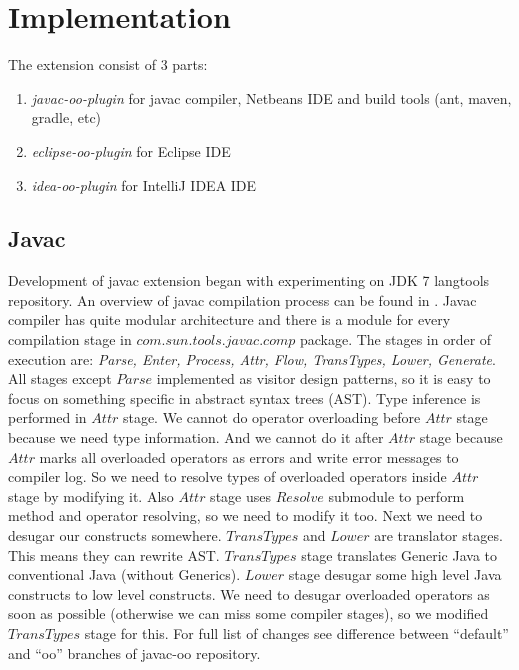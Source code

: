 \documentclass{aircc}
\begin{document}
\section{Implementation}

The extension consist of 3 parts:
\begin{enumerate}
\item \textit{javac-oo-plugin} for javac compiler, Netbeans IDE and build tools (ant, maven, gradle, etc)
\item \textit{eclipse-oo-plugin} for Eclipse IDE
\item \textit{idea-oo-plugin} for IntelliJ IDEA IDE
\end{enumerate}

\subsection{Javac\label{javac}}
Development of javac extension began with experimenting on JDK 7 langtools repository\cite{javac-oo}.
An overview of javac compilation process can be found in \cite{HackerGuideJavac}.
Javac compiler has quite modular architecture and there is a module for every compilation stage in $com.sun.tools.javac.comp$ package.
The stages in order of execution are: \textit{Parse, Enter, Process, Attr, Flow, TransTypes, Lower, Generate}.
All stages except $Parse$ implemented as visitor design patterns, so it is easy to focus on something specific in abstract syntax trees (AST).
Type inference is performed in $Attr$ stage.
We cannot do operator overloading before $Attr$ stage because we need type information. 
And we cannot do it after $Attr$ stage because $Attr$ marks all overloaded operators as errors and write error messages to compiler log.
So we need to resolve types of overloaded operators inside $Attr$ stage by modifying it. 
Also $Attr$ stage uses $Resolve$ submodule to perform method and operator resolving, so we need to modify it too.
Next we need to desugar our constructs somewhere.
$TransTypes$ and $Lower$ are translator stages. This means they can rewrite AST.
$TransTypes$ stage translates Generic Java to conventional Java (without Generics).
$Lower$ stage desugar some high level Java constructs to low level constructs.
We need to desugar overloaded operators as soon as possible (otherwise we can miss some compiler stages), 
so we modified $TransTypes$ stage for this.
For full list of changes see difference between ``default'' and ``oo'' branches of javac-oo repository\cite{javac-oo}.
\end{document}
